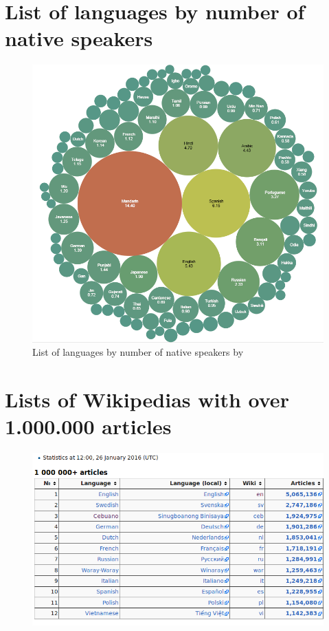 \section{List of languages by number of native speakers}
\begin{figure}[H]
	\centering
	\includegraphics[width=\textwidth]{diagrams/List_of_languages_by_number_of_native_speakers.png}
	\caption{List of languages by number of native speakers by \citet{appendixDia:02}}
	\label{fig:listLang}
\end{figure}

\section{Lists of Wikipedias with over 1.000.000 articles}
\begin{figure}[H]
	\centering
	\includegraphics[width=\textwidth]{diagrams/list-of-wikis-articles.png}
	\caption{\citet{appendixDia:03}}
	\label{fig:wikipedias-articles}
\end{figure}